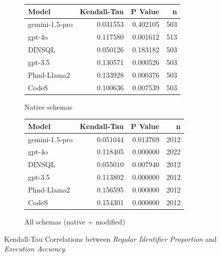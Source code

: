 \begin{figure}
  \centering
  \begin{subfigure}{.5\linewidth}
      \centering
      \begin{tabular}{lrrr}
\toprule
Model & Kendall-Tau & P Value & n \\
\midrule
gemini-1.5-pro & 0.031553 & 0.402105 & 503 \\
gpt-4o & 0.117580 & 0.001612 & 513 \\
DINSQL & 0.050126 & 0.183182 & 503 \\
gpt-3.5 & 0.130571 & 0.000526 & 503 \\
Phnd-Llama2 & 0.133928 & 0.000376 & 503 \\
CodeS & 0.100636 & 0.007539 & 503 \\
\bottomrule
\end{tabular}

      \caption{Native schemas}
      \label{table:nathigh-manual-match-ktau-native}
  \end{subfigure}%
  \begin{subfigure}{.5\linewidth}
      \centering
      \begin{tabular}{lrrr}
\toprule
Model & Kendall-Tau & P Value & n \\
\midrule
gemini-1.5-pro & 0.051044 & 0.013769 & 2012 \\
gpt-4o & 0.118405 & 0.000000 & 2022 \\
DINSQL & 0.055010 & 0.007940 & 2012 \\
gpt-3.5 & 0.113802 & 0.000000 & 2012 \\
Phnd-Llama2 & 0.156595 & 0.000000 & 2012 \\
CodeS & 0.154301 & 0.000000 & 2012 \\
\bottomrule
\end{tabular}

      \caption{All schemas (native + modified)}
      \label{table:nathigh-manual-match-ktau-all}
  \end{subfigure}
  \caption{Kendall-Tau Correlations between \emph{Regular Identifier Proportion} and \emph{Execution Accuracy}.}
\end{figure}

